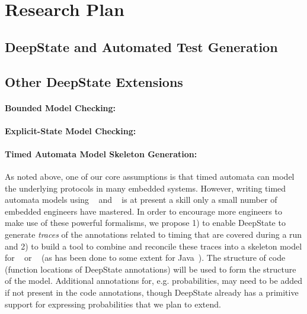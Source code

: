 \section{Research Plan}

%

\subsection{DeepState and Automated Test Generation}
\label{sec:framac2deepstate}


\subsection{Other DeepState Extensions}

\paragraph{Bounded Model Checking:}


\paragraph{Explicit-State Model Checking:}


\paragraph{Timed Automata Model Skeleton Generation:}
As noted above, one of our core assumptions is that timed automata can
model the underlying protocols in many embedded systems.  However,
writing timed automata models using \uppaal~\cite{uppaal} and
\prism~\cite{KNP2011:CAV} is at present a skill only a small number of
embedded engineers have mastered.  In order to encourage more
engineers to make use of these powerful formalisms, we propose 1) to
enable DeepState to generate \emph{traces} of the annotations related
to timing that are covered during a run and 2) to build a tool to
combine and reconcile these traces into a skeleton model for \uppaal~\cite{uppaal} or
\prism~\cite{KNP2011:CAV} (as has been done to some extent for Java~\cite{liva2017extracting}).  The structure of code (function locations
of DeepState annotations) will be used to form the structure of the
model.  Additional annotations for, e.g. probabilities, may need to be
added if not present in the code annotations, though DeepState already
has a primitive support for expressing probabilities that we plan to extend.

